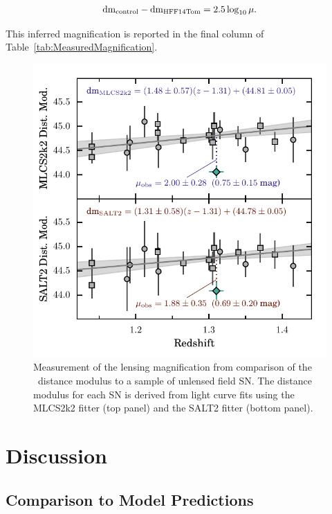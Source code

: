 \begin{equation} \label{eqn:mu}
{\rm dm}_{\rm control} - {\rm dm}_{\rm HFF14Tom} = 2.5 \log_{10}\mu.
\end{equation}

\noindent This inferred magnification is reported in the final column of
Table~\ref{tab:MeasuredMagnification}.

\begin{figure}
\begin{center}
\includegraphics[width=\columnwidth]{FIG/snTomas_hubble_diagram}
\caption{ Measurement of the lensing magnification from comparison of
the \tomas\ distance modulus to a sample of unlensed field SN.
The distance modulus for each SN is derived from light curve fits
using the MLCS2k2 fitter (top panel) and the SALT2 fitter (bottom panel).
\label{fig:MagnificationMeasurement} }
\end{center}
\end{figure}


\section{Discussion}
\label{sec:Discussion}

\subsection{Comparison to Model Predictions}
\label{sec:ComparisonToModelPredictions}

